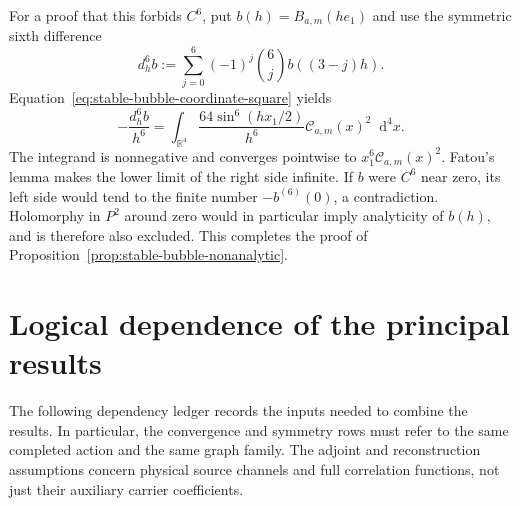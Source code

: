 \documentclass[final,5p,times,twocolumn,numbers,nopreprintline]{elsarticle}
\numberwithin{equation}{section}
\theoremstyle{definition}
\theoremstyle{remark}
\newcommand{\dd}{\mathop{}\!\mathrm d}
\newcommand{\RR}{\mathbb R}
\begin{document}
For a proof that this forbids \(C^6\), put \(b(h)=B_{a,m}(h e_1)\)
and use the symmetric sixth difference
\[
 d_h^6b:=\sum_{j=0}^6(-1)^j\binom{6}{j}b((3-j)h).
\]
Equation~\eqref{eq:stable-bubble-coordinate-square} yields
\begin{equation}
 -\frac{d_h^6b}{h^6}
   =\int_{\RR^4}\frac{64\sin^6(hx_1/2)}{h^6}
                  \mathcal C_{a,m}(x)^2\dd^4x.
 \label{eq:stable-sixth-difference}
\end{equation}
The integrand is nonnegative and converges pointwise to
\(x_1^6\mathcal C_{a,m}(x)^2\). Fatou's lemma makes the
lower limit of the right side infinite. If \(b\) were \(C^6\)
near zero, its left side would tend to the finite number
\(-b^{(6)}(0)\), a contradiction. Holomorphy in \(P^2\)
around zero would in particular imply analyticity of \(b(h)\),
and is therefore also excluded. This completes the proof of
Proposition~\ref{prop:stable-bubble-nonanalytic}.

\section{Logical dependence of the principal results}
\label{sec:dependence}

The following dependency ledger records the inputs needed to combine the results.
In particular, the convergence and symmetry rows must refer to the
same completed action and the same graph family.
The adjoint and reconstruction assumptions concern physical source
channels and full correlation functions, not just their auxiliary
carrier coefficients.
\end{document}

